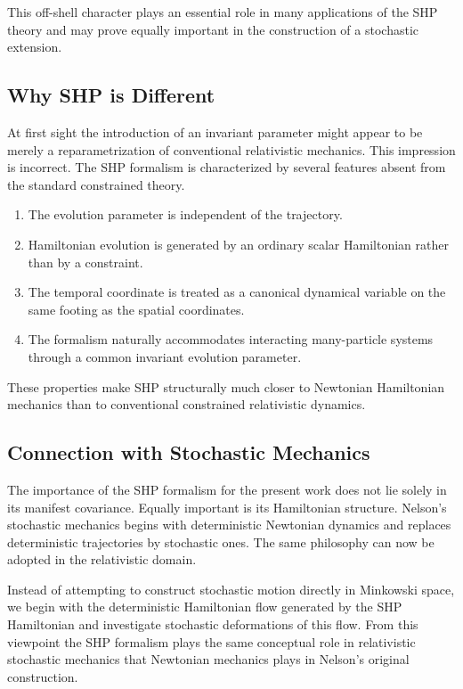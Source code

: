 This off-shell character plays an essential role in many applications of
the SHP theory and may prove equally important in the construction of a
stochastic extension.
\subsection{Why SHP is Different}
At first sight the introduction of an invariant parameter might appear to
be merely a reparametrization of conventional relativistic mechanics.
This impression is incorrect.
The SHP formalism is characterized by several features absent from the
standard constrained theory.
\begin{enumerate}
   \item
    The evolution parameter is independent of the trajectory.
   \item
    Hamiltonian evolution is generated by an ordinary scalar
    Hamiltonian rather than by a constraint.
   \item
    The temporal coordinate is treated as a canonical dynamical
    variable on the same footing as the spatial coordinates.
   \item
    The formalism naturally accommodates interacting many-particle
    systems through a common invariant evolution parameter.
\end{enumerate}
These properties make SHP structurally much closer to Newtonian
Hamiltonian mechanics than to conventional constrained relativistic
dynamics.
\subsection{Connection with Stochastic Mechanics}
The importance of the SHP formalism for the present work does not lie
solely in its manifest covariance.
Equally important is its Hamiltonian structure.
Nelson's stochastic mechanics begins with deterministic Newtonian
dynamics and replaces deterministic trajectories by stochastic ones.
The same philosophy can now be adopted in the relativistic domain.

Instead of attempting to construct stochastic motion directly in
Minkowski space, we begin with the deterministic Hamiltonian flow
generated by the SHP Hamiltonian and investigate stochastic
deformations of this flow.
From this viewpoint the SHP formalism plays the same conceptual role in
relativistic stochastic mechanics that Newtonian mechanics plays in
Nelson's original construction.
